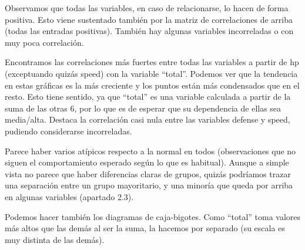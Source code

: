 \documentclass[
  12pt,
]{extreport}
\begin{document}
Observamos que todas las variables, en caso de relacionarse, lo hacen de
forma positiva. Esto viene sustentado también por la matriz de
correlaciones de arriba (todas las entradas positivas). También hay
algunas variables incorreladas o con muy poca correlación.

Encontramos las correlaciones más fuertes entre todas las variables a
partir de hp (exceptuando quizás speed) con la variable ``total''.
Podemos ver que la tendencia en estas gráficas es la más creciente y los
puntos están más condensados que en el resto. Esto tiene sentido, ya que
``total'' es una variable calculada a partir de la suma de las otras 6,
por lo que es de esperar que su dependencia de ellas sea media/alta.
Destaca la correlación casi nula entre las variables defense y speed,
pudiendo considerarse incorreladas.

Parece haber varios atípicos respecto a la normal en todos
(observaciones que no siguen el comportamiento esperado según lo que es
habitual). Aunque a simple vista no parece que haber diferencias claras
de grupos, quizás podríamos trazar una separación entre un grupo
mayoritario, y una minoría que queda por arriba en algunas variables
(apartado 2.3).

Podemos hacer también los diagramas de caja-bigotes. Como ``total'' toma
valores más altos que las demás al ser la suma, la hacemos por separado
(su escala es muy distinta de las demás).
\end{document}
